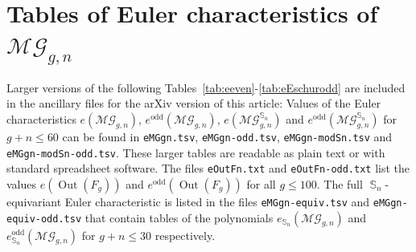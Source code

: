 \documentclass[oneside]{amsart}
\theoremstyle{remark}
\DeclareMathOperator{\SG}{{\mathbb S}}
\newcommand{\Out}{{\operatorname{Out}}}
\newcommand{\MG}{\mathcal{MG}}
\begin{document}
\appendix
\section{Tables of Euler characteristics of \texorpdfstring{$\MG_{g,n}$}{MGgn}}
Larger versions of the following Tables~\ref{tab:eeven}-\ref{tab:eEschurodd} are included in the ancillary files for the arXiv version of this article:
Values  %
of the Euler characteristics
$e(\MG_{g,n})$,
$e^\mathrm{odd}(\MG_{g,n})$,
$e(\MG_{g,n}^{\SG_n})$ and 
$e^\mathrm{odd}(\MG_{g,n}^{\SG_n})$
for $g+n \leq 60$ can be found in \texttt{eMGgn.tsv}, \texttt{eMGgn-odd.tsv}, \texttt{eMGgn-modSn.tsv} and \texttt{eMGgn-modSn-odd.tsv}.
These larger tables are readable as plain text or with standard spreadsheet software.
The files \texttt{eOutFn.txt} and \texttt{eOutFn-odd.txt} list the values $e(\Out(F_g))$ and $e^\textrm{odd}(\Out(F_g))$ for all $g\leq 100$.
The full $\SG_n$-equivariant Euler characteristic is listed in the files \texttt{eMGgn-equiv.tsv} and \texttt{eMGgn-equiv-odd.tsv} that contain tables of the polynomials $e_{\SG_n}(\MG_{g,n})$ and $e_{\SG_n}^\mathrm{odd}(\MG_{g,n})$ for $g+n \leq 30$ respectively.

%
\end{document}
